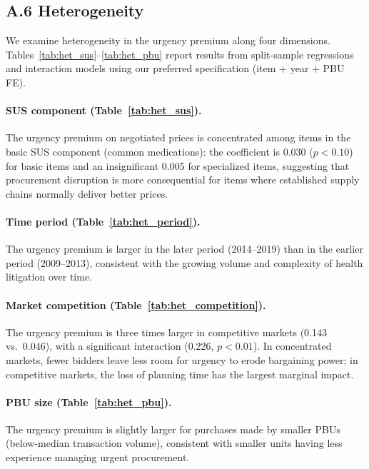 \subsection*{A.6 Heterogeneity}
\label{sec:appendix_het}

We examine heterogeneity in the urgency premium along four dimensions. Tables~\ref{tab:het_sus}--\ref{tab:het_pbu} report results from split-sample regressions and interaction models using our preferred specification (item + year + PBU FE).






\paragraph{SUS component (Table~\ref{tab:het_sus}).}
The urgency premium on negotiated prices is concentrated among items in the basic SUS component (common medications): the coefficient is 0.030 ($p < 0.10$) for basic items and an insignificant 0.005 for specialized items, suggesting that procurement disruption is more consequential for items where established supply chains normally deliver better prices.

\paragraph{Time period (Table~\ref{tab:het_period}).}
The urgency premium is larger in the later period (2014--2019) than in the earlier period (2009--2013), consistent with the growing volume and complexity of health litigation over time.

\paragraph{Market competition (Table~\ref{tab:het_competition}).}
The urgency premium is three times larger in competitive markets (0.143 vs.\ 0.046), with a significant interaction (0.226, $p < 0.01$). In concentrated markets, fewer bidders leave less room for urgency to erode bargaining power; in competitive markets, the loss of planning time has the largest marginal impact.

\paragraph{PBU size (Table~\ref{tab:het_pbu}).}
The urgency premium is slightly larger for purchases made by smaller PBUs (below-median transaction volume), consistent with smaller units having less experience managing urgent procurement.
